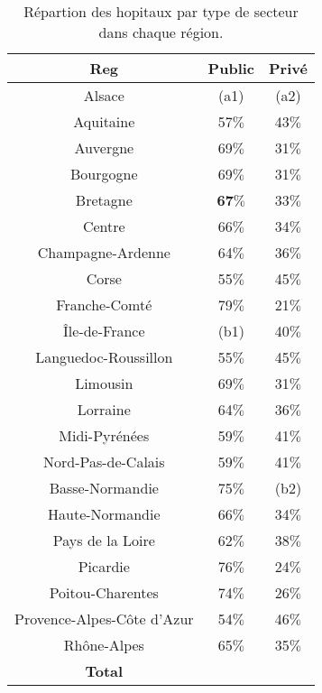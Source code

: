 \documentclass[a4paper,11pt]{article}
\begin{document}
\begin{table}
\begin{center}
\begin{tabular}{|c||c|c|}
\hline 
\textbf{Reg}& \textbf{Public}& \textbf{Privé}\\ \hline \hline

Alsace&(a1)&(a2)\\ \hline

Aquitaine&57$\%$&43$\%$\\ \hline

Auvergne&69$\%$&31$\%$\\ \hline

Bourgogne&69$\%$&31$\%$\\ \hline

Bretagne&{\large \textbf{67}$\%$}&33$\%$\\ \hline

Centre&66$\%$&34$\%$\\ \hline

Champagne-Ardenne&64$\%$&36$\%$\\ \hline

Corse&55$\%$&45$\%$\\ \hline

Franche-Comté&79$\%$&21$\%$\\ \hline

Île-de-France&(b1)&40$\%$\\ \hline
Languedoc-Roussillon&55$\%$&45$\%$\\ \hline

Limousin&69$\%$&31$\%$\\ \hline

Lorraine&64$\%$&36$\%$\\ \hline

Midi-Pyrénées&59$\%$&41$\%$\\ \hline

Nord-Pas-de-Calais&59$\%$&41$\%$\\ \hline

Basse-Normandie&75$\%$&(b2)\\ \hline

Haute-Normandie&66$\%$&34$\%$\\ \hline

Pays de la Loire&62$\%$&38$\%$\\ \hline

Picardie&76$\%$&24$\%$\\ \hline

Poitou-Charentes&74$\%$&26$\%$\\ \hline

Provence-Alpes-Côte d'Azur&54$\%$&46$\%$\\ \hline
Rhône-Alpes&65$\%$&35$\%$\\ \hline \hline

\textbf{Total} & &\\ \hline
\end{tabular} 
\caption{Répartion des hopitaux par type de secteur dans chaque région.}
\label{tab:secteur}
\end{center}
\end{table}
\end{document}
